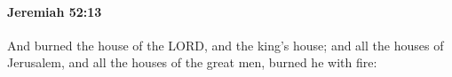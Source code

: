 
		\paragraph{Jeremiah 52:13} %
			\label{JEREMIAH-52-13}

			And burned the house of the LORD, and the king’s house; and all the houses of Jerusalem, and all the houses of the great men, burned he with fire:


